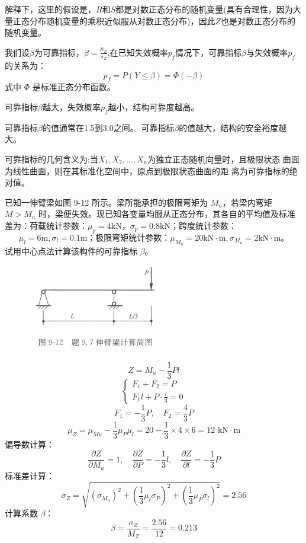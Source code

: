 \documentclass[12pt, a4paper, oneside, UTF8]{ctexbook}
\begin{document}
解释下，这里的假设是，$R$和$S$都是对数正态分布的随机变量(具有合理性，因为大量正态分布随机变量的乘积近似服从对数正态分布)，因此$Z$也是对数正态分布的随机变量。

我们设$\beta$为可靠指标，$\beta = \frac{\mu_Z}{\sigma_Z}$,在已知失效概率$p_f$情况下，可靠指标$\beta$与失效概率$p_f$的关系为：
\[
p_f = P(Y \leq \beta) = \Phi(-\beta)
\]
    式中 \(\Phi\) 是标准正态分布函数。
\begin{remark}
    可靠指标$\beta$越大，失效概率$p_f$越小，结构可靠度越高。

    可靠指标$\beta$的值通常在1.5到3.0之间。
    可靠指标$\beta$的值越大，结构的安全裕度越大。
\end{remark}

\begin{remark}
    可靠指标的几何含义为:当$X_1, X_2, \ldots, X_n$为独立正态随机向量时，且极限状态
曲面为线性曲面，则在其标准化空间中，原点到极限状态曲面的距
离为可靠指标的绝对值。
\end{remark}

\begin{example}
已知一伸臂梁如图 9-12 所示。梁所能承担的极限弯矩为 \( M_u \)，若梁内弯矩 \( M > M_u \) 时，梁便失效。现已知各变量均服从正态分布，其各自的平均值及标准差为：荷载统计参数：\( \mu_p = 4 \text{kN} \)，\( \sigma_p = 0.8 \text{kN} \)；跨度统计参数：
\[
\mu_l = 6 \text{m}, \sigma_l = 0.1 \text{m} \text{；极限弯矩统计参数：} \mu_{M_u} = 20 \text{kN} \cdot \text{m}, \sigma_{M_u} = 2 \text{kN} \cdot \text{m} \text{。}
\]
试用中心点法计算该构件的可靠指标 \( \beta \)。

\begin{figure}[H]
\centering
\includegraphics[width=0.6\textwidth]{../figure/5.png}
\end{figure}

\[
Z = M_u - \frac{1}{3} P l
\]
\[
\begin{cases}
F_1 + F_2 = P \\
F_1 l + P \cdot \frac{l}{3} = 0
\end{cases}
\]
\[
F_1 = -\frac{1}{3} P, \quad F_2 = \frac{4}{3} P
\]
\[
\mu_Z = \mu_{Mu} - \frac{1}{3} \mu_P \mu_l = 20 - \frac{1}{3} \times 4 \times 6 = 12 \text{ kN} \cdot \text{m}
\]
偏导数计算：
\[
\frac{\partial Z}{\partial M_u} = 1, \quad \frac{\partial Z}{\partial P} =-\frac{1}{3} l, \quad \frac{\partial Z}{\partial l} = -\frac{1}{3} P
\]
标准差计算：
\[
\sigma_Z = \sqrt{
    (\sigma_{M_u})^2 + \left(\frac{1}{3} \mu_l \sigma_ P \right)^2 + \left(\frac{1}{3} \mu_P \sigma_l \right)^2
} 
= 2.56
\]
计算系数 $\beta$：
\[
\beta = \frac{\sigma_Z}{M_Z} = \frac{2.56}{12} = 0.213
\]
\end{example}

\ifx\allfiles\undefined
\end{document}
